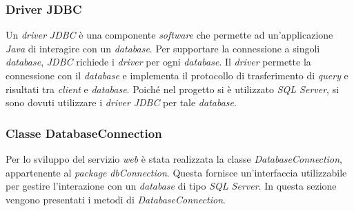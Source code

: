 \subsubsection{Driver JDBC}

Un \textit{driver} \textit{JDBC} è una componente \textit{software} che permette ad un'applicazione \textit{Java} di interagire con un \textit{database}. Per supportare la connessione a singoli \textit{database}, \textit{JDBC} richiede i \textit{driver} per ogni \textit{database}. Il \textit{driver} permette la connessione con il \textit{database} e implementa il protocollo di trasferimento di \textit{query} e risultati tra \textit{client} e \textit{database}. Poiché nel progetto si è utilizzato \textit{SQL Server}, si sono dovuti utilizzare i \textit{driver} \textit{JDBC} per tale \textit{database}.

\subsubsection{Classe DatabaseConnection} \label{dbconnect}

Per lo sviluppo del servizio \textit{web} è stata realizzata la classe \textit{DatabaseConnection}, appartenente al \textit{package} \textit{dbConnection}. Questa fornisce un'interfaccia utilizzabile per gestire l'interazione con un \textit{database} di tipo \textit{SQL Server}. In questa sezione vengono presentati i metodi di \textit{DatabaseConnection}.


